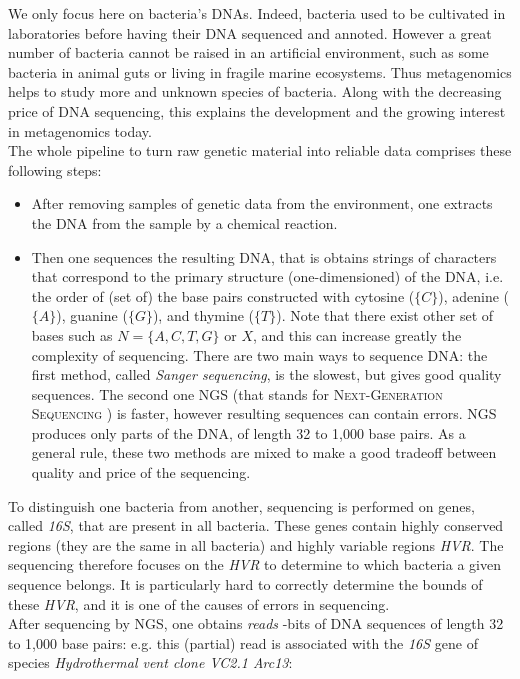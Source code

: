 \documentclass{report}
\begin{document}
We only focus here on bacteria's DNAs. Indeed, bacteria used to be cultivated in laboratories before having their DNA sequenced and annoted. However a great number of bacteria cannot be raised in an artificial environment, such as some bacteria in animal guts or living in fragile marine ecosystems. Thus metagenomics helps to study more and unknown species of bacteria. Along with the decreasing price of DNA sequencing, this explains the development and the growing interest in metagenomics today.\\

The whole pipeline to turn raw genetic material into reliable data comprises these following steps:
\begin{itemize}
\item After removing samples of genetic data from the environment, one extracts the DNA from the sample by a chemical reaction.
\item Then one sequences the resulting DNA, that is obtains strings of characters that correspond to the primary structure (one-dimensioned) of the DNA, i.e. the order of (set of) the base pairs constructed with cytosine ($\{C\}$), adenine ($\{A\}$), guanine ($\{G\}$), and thymine ($\{T\}$). Note that there exist other set of bases such as $N = \{A,C,T,G\}$ or $X$, and this can increase greatly the complexity of sequencing. There are two main ways to sequence DNA: the first method, called \emph{Sanger sequencing}, is the slowest, but gives good quality sequences. The second one NGS (that stands for \textsc{Next-Generation Sequencing} \cite{WikiNGS}) is faster, however resulting sequences can contain errors. NGS produces only parts of the DNA, of length 32 to 1,000 base pairs. As a general rule, these two methods are mixed to make a good tradeoff between quality and price of the sequencing.
\end{itemize}

To distinguish one bacteria from another, sequencing is performed on genes, called \emph{16S}, that are present in all bacteria. These genes contain highly conserved regions (they are the same in all bacteria) and highly variable regions \emph{HVR}. The sequencing therefore focuses on the \emph{HVR} to determine to which bacteria a given sequence belongs. It is particularly hard to correctly determine the bounds of these \emph{HVR}, and it is one of the causes of errors in sequencing.\\

After sequencing by NGS, one obtains \emph{reads} -bits of DNA sequences of length 32 to 1,000 base pairs: e.g. this (partial) read is associated with the \emph{16S} gene of species \emph{Hydrothermal vent clone VC2.1 Arc13}:\\
\end{document}
